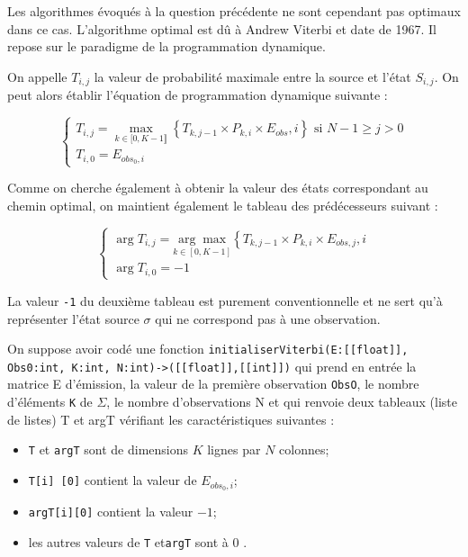 Les algorithmes évoqués à la question précédente ne sont cependant pas optimaux dans ce cas. L'algorithme optimal est dû à Andrew Viterbi et date de 1967. Il repose sur le paradigme de la programmation dynamique.

On appelle $T_{i, j}$ la valeur de probabilité maximale entre la source et l'état $S_{i, j}$. On peut alors établir l'équation de programmation dynamique suivante :

$$
\left\{\begin{array}{l}
T_{i, j}=\max _{k \in[0, K-1 \rrbracket}\left\{T_{k, j-1} \times P_{k, i} \times E_{o b s}, i\right\} \text{ si } N-1 \geq j > 0  \\
T_{i, 0}=E_{o b s_{0}, i}
\end{array}\right.
$$

Comme on cherche également à obtenir la valeur des états correspondant au chemin optimal, on maintient également le tableau des prédécesseurs suivant :

$$
\left\{\begin{array}{l}
\arg T_{i, j}=\underset{k \in[0, K-1]}{\arg \max }\left\{T_{k, j-1} \times P_{k, i} \times E_{o b s, j}, i\right. \\
\arg T_{i, 0}=-1
\end{array}\right.
$$

La valeur \lstinline{-1} du deuxième tableau est purement conventionnelle et ne sert qu'à représenter l'état source $\sigma$ qui ne correspond pas à une observation.

On suppose avoir codé une fonction \lstinline{initialiserViterbi(E:[[float]], Obs0:int, K:int, N:int)->([[float]],[[int]])} qui prend en entrée la matrice E d'émission, la valeur de la première observation \lstinline{ObsO}, le nombre d'éléments \lstinline{K} de $\Sigma$, le nombre d'observations N et qui renvoie deux tableaux (liste de listes) T et argT vérifiant les caractéristiques suivantes :

\begin{itemize}
  \item \lstinline{T} et \lstinline{argT} sont de dimensions $K$ lignes par $N$ colonnes;
  \item \lstinline{T[i] [0]} contient la valeur de $E_{o b s_{0}, i}$;
  \item \lstinline{argT[i][0]} contient la valeur $-1$;
  \item les autres valeurs de \lstinline{T} et\lstinline{argT} sont à 0 .
\end{itemize}

